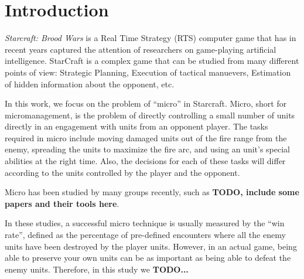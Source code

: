 \section{Introduction}\label{section:introduction}

\emph{Starcraft: Brood Wars} is a Real Time Strategy (RTS) computer
game that has in recent years captured the attention of researchers on
game-playing artificial intelligence. StarCraft is a complex game that
can be studied from many different points of view: Strategic Planning,
Execution of tactical manuevers, Estimation of hidden information
about the opponent, etc.

In this work, we focus on the problem of ``micro'' in
Starcraft. Micro, short for micromanagement, is the problem of
directly controlling a small number of units directly in an engagement
with units from an opponent player. The tasks required in micro
include moving damaged units out of the fire range from the enemy,
spreading the units to maximize the fire arc, and using an unit's
special abilities at the right time. Also, the decisions for each of
these tasks will differ according to the units controlled by the
player and the opponent.

Micro has been studied by many groups recently, such as {\bf TODO,
  include some papers and their tools here}.

In these studies, a successful micro technique is usually measured by
the ``win rate'', defined as the percentage of pre-defined encounters
where all the enemy units have been destroyed by the player
units. However, in an actual game, being able to preserve your own
units can be as important as being able to defeat the enemy
units. Therefore, in this study we {\bf TODO...}

